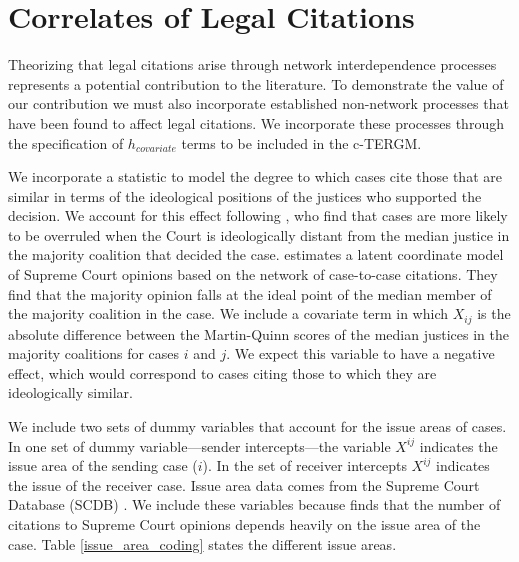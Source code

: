 \documentclass[headsepline=true, abstracton]{scrartcl}
\begin{document}
\section{Correlates of Legal Citations}

Theorizing that legal citations arise through network interdependence processes represents a potential contribution to the literature. To demonstrate the value of our contribution we must also incorporate established non-network processes that have been found to affect legal citations. We incorporate these processes through the specification of $h_{covariate}$  terms to be included in the c-TERGM. 

We incorporate a statistic to model the degree to which cases cite those that are similar in terms of the ideological positions of the justices who supported the decision. We account for this effect following \citet{spriggs2001explaining}, who find that cases are more likely to be overruled when the Court is ideologically distant from the median justice in the majority coalition that decided the case. \citet{clark2010locating} estimates a latent coordinate model of Supreme Court opinions based on the network of case-to-case citations. They find that the majority opinion falls at the ideal point of the median member of the majority coalition in the case. We include a covariate term in which $X_{ij}$ is the absolute difference between the Martin-Quinn scores \citep{martin2002dynamic} of the median justices in the majority coalitions for cases $i$ and $j$. We expect this variable to have a negative effect, which would correspond to cases citing those to which they are ideologically similar.%

We include two sets of dummy variables that account for the issue areas of cases. In one set of dummy variable---sender intercepts---the variable $X^{ij}$ indicates the issue area of the sending case ($i$). In the set of receiver intercepts $X^{ij}$ indicates the issue of the receiver case. Issue area data comes from the Supreme Court Database (SCDB) \citep{spaeth2014supreme}. We include these variables because \citet{cross2010determinants} finds that the number of citations to Supreme Court opinions depends heavily on the issue area of the case. Table \ref{issue_area_coding} states the different issue areas.
\end{document}
